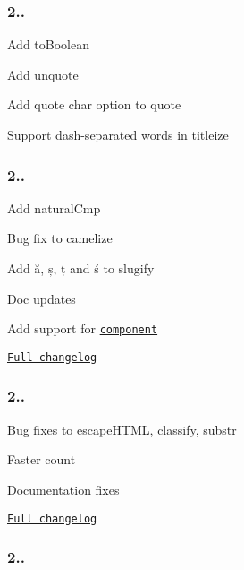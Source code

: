 \subsubsection*{2..}


\begin{DoxyItemize}
\item Add {\ttfamily to\+Boolean}
\item Add {\ttfamily unquote}
\item Add quote char option to {\ttfamily quote}
\item Support dash-\/separated words in {\ttfamily titleize}
\end{DoxyItemize}

\subsubsection*{2..}


\begin{DoxyItemize}
\item Add {\ttfamily natural\+Cmp}
\item Bug fix to {\ttfamily camelize}
\item Add ă, ș, ț and ś to {\ttfamily slugify}
\item Doc updates
\item Add support for \href{http://component.io/}{\tt component}
\item \href{https://github.com/epeli/underscore.string/compare/v2.3.1...v2.3.2}{\tt Full changelog}
\end{DoxyItemize}

\subsubsection*{2..}


\begin{DoxyItemize}
\item Bug fixes to {\ttfamily escape\+H\+T\+M\+L}, {\ttfamily classify}, {\ttfamily substr}
\item Faster {\ttfamily count}
\item Documentation fixes
\item \href{https://github.com/epeli/underscore.string/compare/v2.3.0...v2.3.1}{\tt Full changelog}
\end{DoxyItemize}

\subsubsection*{2..}


